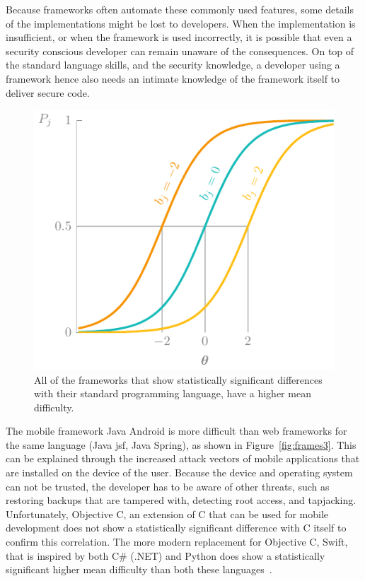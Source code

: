 Because frameworks often automate these commonly used features, some details of the implementations might be lost to developers.
When the implementation is insufficient, or when the framework is used incorrectly, it is possible that even a security conscious developer can remain unaware of the consequences.
On top of the standard language skills, and the security knowledge, a developer using a framework hence also needs an intimate knowledge of the framework itself to deliver secure code.

\begin{figure}
    \centering
    \includegraphics[page=10]{03-education/figures/tikzfigures.pdf}
    \caption[Frameworks versus default languages]{All of the frameworks that show statistically significant differences with their standard programming language, have a higher mean difficulty.}
    \label{fig:frames2}
\end{figure}

The mobile framework Java Android is more difficult than web frameworks for the same language (Java \gls{jsf}, Java Spring), as shown in Figure~\ref{fig:frames3}.
This can be explained through the increased attack vectors of mobile applications that are installed on the device of the user.
Because the device and operating system can not be trusted, the developer has to be aware of other threats, such as restoring backups that are tampered with, detecting root access, and tapjacking.
Unfortunately, Objective C, an extension of C that can be used for mobile development does not show a statistically significant difference with C itself to confirm this correlation.
The more modern replacement for Objective C, Swift, that is inspired by both C\# (.NET) and Python does show a statistically significant higher mean difficulty than both these languages~\cite{nondot}.

